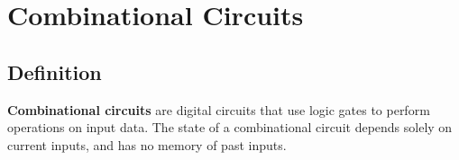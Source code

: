 \chapter{Combinational Circuits}

\section{Definition}

\textbf{Combinational circuits} are digital circuits that use logic gates to perform operations on input data. The state of a combinational circuit depends solely on current inputs, and has no memory of past inputs.